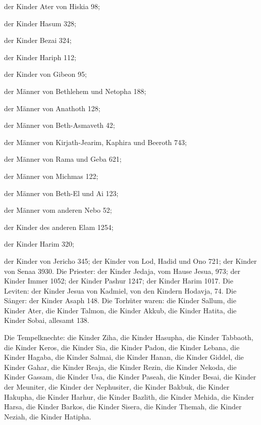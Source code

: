  der Kinder Ater von Hiskia 98;

 der Kinder Hasum 328;

 der Kinder Bezai 324;

 der Kinder Hariph 112;

 der Kinder von Gibeon 95;

 der Männer von Bethlehem und Netopha 188;

 der Männer von Anathoth 128;

 der Männer von Beth-Asmaveth 42;

 der Männer von Kirjath-Jearim, Kaphira und Beeroth 743;

 der Männer von Rama und Geba 621;

 der Männer von Michmas 122;

 der Männer von Beth-El und Ai 123;

 der Männer vom anderen Nebo 52;

 der Kinder des anderen Elam 1254;

 der Kinder Harim 320;

 der Kinder von Jericho 345;  der Kinder von
Lod, Hadid und Ono 721;  der Kinder von Senaa 3930.
 Die Priester: der Kinder Jedaja, vom Hause Jesua, 973;
 der Kinder Immer 1052;  der Kinder Pashur
1247;  der Kinder Harim 1017.  Die Leviten:
der Kinder Jesua von Kadmiel, von den Kindern Hodavja, 74. 
Die Sänger: der Kinder Asaph 148.  Die Torhüter waren: die
Kinder Sallum, die Kinder Ater, die Kinder Talmon, die Kinder Akkub, die
Kinder Hatita, die Kinder Sobai, allesamt 138.

 Die Tempelknechte: die Kinder Ziha, die Kinder Hasupha,
die Kinder Tabbaoth,  die Kinder Keros, die Kinder Sia, die
Kinder Padon,  die Kinder Lebana, die Kinder Hagaba, die
Kinder Salmai,  die Kinder Hanan, die Kinder Giddel, die
Kinder Gahar,  die Kinder Reaja, die Kinder Rezin, die
Kinder Nekoda,  die Kinder Gassam, die Kinder Usa, die
Kinder Paseah,  die Kinder Besai, die Kinder der Meuniter,
die Kinder der Nephusiter,  die Kinder Bakbuk, die Kinder
Hakupha, die Kinder Harhur,  die Kinder Bazlith, die Kinder
Mehida, die Kinder Harsa,  die Kinder Barkos, die Kinder
Sisera, die Kinder Themah,  die Kinder Neziah, die Kinder
Hatipha.

